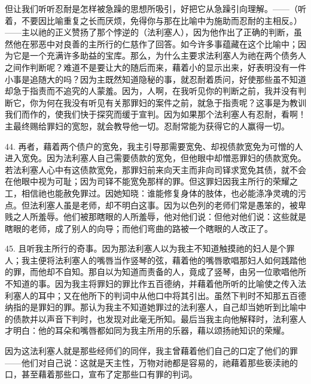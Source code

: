 但让我们听听忍耐是怎样被急躁的思想所吸引，好把它从急躁引向理解。——（听着，不要因比喻重复之长而厌烦，免得你与那在比喻中为施助而忍耐的主相反。）——主以祂的正义赞扬了那个悖逆的（法利塞人），因为他作出了正确的判断，虽然他在邪恶中对良善的主所行的仁慈作了回答。如今许多事蕴藏在这个比喻中；因为它是一个充满许多助益的宝库。那么，为什么主要求法利塞人为祂在两个债务人之间作判断呢？难道不是要让大的随后而来，藉着小的显示出来，好表明没有一件小事是追随大的吗？因为主既然知道隐秘的事，就忍耐着质问，好使那些虽不知道却急于指责而不追究的人蒙羞。因为，人啊，在我听见你的判断之前，我并没有判断它，你为何在我没有听见有关那罪妇的案件之前，就急于指责呢？这事是为教训我们而作的，使我们快于探究而缓于宣判。因为如果那个法利塞人有忍耐，看啊！主最终赐给罪妇的宽恕，就会教导他一切。忍耐常能为获得它的人赢得一切。\par

44. 再者，藉着两个债户的宽免，我主引导那需要宽免、却视债款宽免为可憎的人进入宽免。因为法利塞人自己需要债款的宽免，但他眼中却憎恶罪妇的债款宽免。若法利塞人心中有这债款宽免，那罪妇前来向天主而非向司铎求宽免其债，就不会在他眼中视为可耻；因为司铎不能宽免那样的罪。但这罪妇因我主所行的荣耀之工，相信祂也能赦免罪过。因她知晓：谁能修复身体的肢体，也必能涤净灵魂的污点。但法利塞人虽是老师，却不明白这事。因为以色列的老师们常是愚笨的，被卑贱之人所羞辱。他们被那瞎眼的人所羞辱，他对他们说：但他对他们说：这些就是瞎眼的老师，成了别人的向导；而他们弯曲的路被一个瞎眼的人改正了。\par

45. 且听我主所行的奇事。因为那法利塞人以为我主不知道触摸祂的妇人是个罪人；我主便将法利塞人的嘴唇当作竖琴的弦，藉着他的嘴唇歌唱那妇人如何践踏他的罪，而他却不自知。那自以为知道而责备的人，竟成了竖琴，由另一位歌唱他所不知道的事。因为我主将罪妇的罪比作五百德纳，并藉着他所听的比喻使之传入法利塞人的耳中；又在他所下的判词中从他口中将其引出。虽然下判时不知那五百德纳指的是罪妇的罪。那认为我主不知道她罪过的法利塞人，自己却当她听到比喻中的债款并以声音下判时，也发现对此毫无所知。最后当我主向他解释时，法利塞人才明白：他的耳朵和嘴唇都如同为我主所用的乐器，藉以颂扬祂知识的荣耀。\par

因为这法利塞人就是那些经师们的同伴，我主曾藉着他们自己的口定了他们的罪——他们对自己说：这就是天主性，万物对祂都是容易的，祂藉着那些亵渎祂的口，甚至藉着那些口，宣布了定那些口有罪的判词。\par


